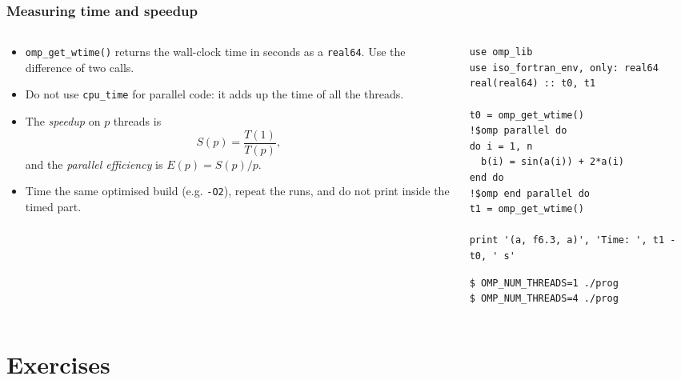 \begin{frame}[fragile]
  \frametitle{Measuring time and speedup}
  \begin{columns}[T]
    \begin{column}{0.5\textwidth}
      \begin{itemize}
        \item \texttt{omp\_get\_wtime()} returns the wall-clock time in seconds as a \texttt{real64}. Use the difference of two calls.
        \item Do not use \texttt{cpu\_time} for parallel code: it adds up the time of all the threads.
        \item The \emph{speedup} on $p$ threads is
          \[ S(p) = \frac{T(1)}{T(p)}, \]
          and the \emph{parallel efficiency} is $E(p) = S(p)/p$.
        \item Time the same optimised build (e.g. \texttt{-O2}), repeat the runs, and do not print inside the timed part.
      \end{itemize}
    \end{column}

    \begin{column}{0.5\textwidth}
      \begin{lstlisting}
use omp_lib
use iso_fortran_env, only: real64
real(real64) :: t0, t1

t0 = omp_get_wtime()
!$omp parallel do
do i = 1, n
  b(i) = sin(a(i)) + 2*a(i)
end do
!$omp end parallel do
t1 = omp_get_wtime()

print '(a, f6.3, a)', 'Time: ', t1 - t0, ' s'
      \end{lstlisting}

      \begin{lstlisting}[language=bash]
$ OMP_NUM_THREADS=1 ./prog
$ OMP_NUM_THREADS=4 ./prog
      \end{lstlisting}
    \end{column}
  \end{columns}
\end{frame}


\section{Exercises}

